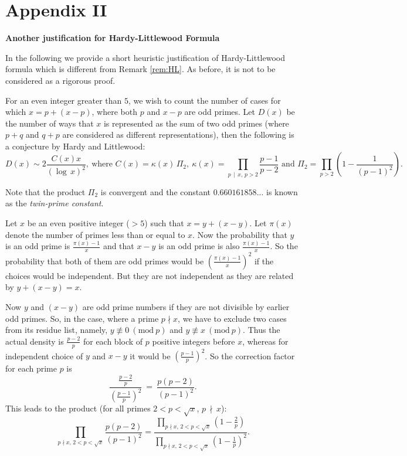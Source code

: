 \documentclass[11pt]{article}
\theoremstyle{definition}
\theoremstyle{remark}
\numberwithin{equation}{section}
\newcommand{\nMod}[3]{#1\not\equiv #2\ (\textrm{mod}\ #3)}
\newcommand{\Div}[2]{#1\,\mid\, #2}
\newcommand{\nDiv}[2]{#1\,\nmid\, #2}
\begin{document}
\newpage

\section{Appendix II}
\noindent
{\bf Another justification for Hardy-Littlewood Formula}

\noindent
In the following we provide a short heuristic justification of Hardy-Littlewood formula which is different from Remark \ref{rem:HL}. As before, it is not to be considered as a rigorous proof.

\vspace{1em}
\noindent
For an even integer greater than $5$, we wish to count the number of cases for which $x=p+(x-p)$, where both $p$ and $x-p$ are odd primes. Let $D(x)$ be the number of ways that $x$ is represented as the sum of two odd primes (where $p+q$ and $q+p$ are considered as different representations), then the following is a conjecture by Hardy and Littlewood:
$$D(x)\sim 2 \frac{C(x) x}{(\log\, x)^2},\ \text{where } C(x)=\kappa(x)\, \Pi_2,\ \kappa(x)=\prod\limits_{\Div{p}{x},\, p>2} \frac{p-1}{p-2}\text{ and }\Pi_2= \prod\limits_{p>2} \left( 1-\frac{1}{(p-1)^2}\right).$$

\noindent
Note that the product $\Pi_2$ is convergent and the constant $0.660161858...$ is known as the {\em twin-prime constant}. 

Let $x$ be an even positive integer ($>5$) such that $x=y+(x-y)$. Let $\pi(x)$ denote the number of primes less than or equal to $x$. Now the probability that $y$ is an odd prime is $\frac{\pi(x)-1}{x}$ and that $x-y$ is an odd prime is also $\frac{\pi(x)-1}{x}$. So the probability that both of them are odd primes would be $\left(\frac{\pi(x)-1}{x}\right)^2$ if the choices would be independent. But they are not independent as they are related by $y+(x-y)=x$.

\vspace{1em}
\noindent
Now $y$ and $(x-y)$ are odd prime numbers if they are not divisible by earlier odd primes. So, in the case, where a prime $p\nmid x$, we have to exclude two cases from its residue list, namely, $\nMod{y}{0}{p}$ and $\nMod{y}{x}{p}$. Thus the actual density is $\frac{p-2}{p}$ for each block of $p$ positive integers before $x$, whereas for independent choice of $y$ and $x-y$ it would be $\left(\frac{p-1}{p}\right)^2$. So the correction factor for each prime $p$ is $$\frac{\frac{p-2}{p}}{\left(\frac{p-1}{p}\right)^2}\ =\ \frac{p(p-2)}{(p-1)^2}.$$
This leads to the product (for all primes $2<p<\sqrt{x}$, $\nDiv{p}{x}$):
$$\prod\limits_{p\nmid x,\, 2<p<\sqrt{x}} \frac{p(p-2)}{(p-1)^2}=\frac{\prod\limits_{p\nmid x,\,2<p<\sqrt{x}} \left(1-\frac{2}{p}\right)}{\prod\limits_{p\nmid x,\,2<p<\sqrt{x}} \left(1-\frac{1}{p}\right)^2}.$$
\end{document}
